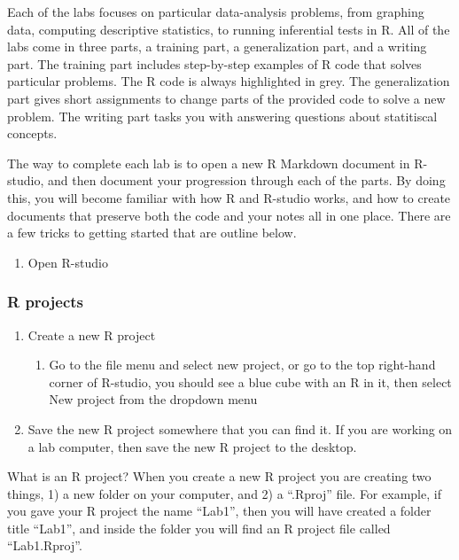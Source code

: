 \documentclass[
]{book}
\providecommand{\tightlist}{%
  \setlength{\itemsep}{0pt}\setlength{\parskip}{0pt}}
\begin{document}
Each of the labs focuses on particular data-analysis problems, from graphing data, computing descriptive statistics, to running inferential tests in R. All of the labs come in three parts, a training part, a generalization part, and a writing part. The training part includes step-by-step examples of R code that solves particular problems. The R code is always highlighted in grey. The generalization part gives short assignments to change parts of the provided code to solve a new problem. The writing part tasks you with answering questions about statitiscal concepts.

The way to complete each lab is to open a new R Markdown document in R-studio, and then document your progression through each of the parts. By doing this, you will become familiar with how R and R-studio works, and how to create documents that preserve both the code and your notes all in one place. There are a few tricks to getting started that are outline below.

\begin{enumerate}
\def\labelenumi{\arabic{enumi}.}
\tightlist
\item
  Open R-studio
\end{enumerate}

\hypertarget{r-projects}{%
\subsubsection{R projects}\label{r-projects}}

\begin{enumerate}
\def\labelenumi{\arabic{enumi}.}
\setcounter{enumi}{1}
\tightlist
\item
  Create a new R project

  \begin{enumerate}
  \def\labelenumii{\alph{enumii}.}
  \tightlist
  \item
    Go to the file menu and select new project, or go to the top right-hand corner of R-studio, you should see a blue cube with an R in it, then select New project from the dropdown menu
  \end{enumerate}
\item
  Save the new R project somewhere that you can find it. If you are working on a lab computer, then save the new R project to the desktop.
\end{enumerate}

What is an R project? When you create a new R project you are creating two things, 1) a new folder on your computer, and 2) a ``.Rproj'' file. For example, if you gave your R project the name ``Lab1'', then you will have created a folder title ``Lab1'', and inside the folder you will find an R project file called ``Lab1.Rproj''.
\end{document}
